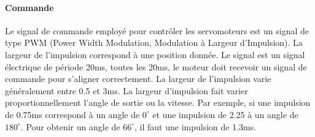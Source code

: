 				\paragraph{Commande}Le signal de commande employé pour contrôler les servomoteurs est un signal de type PWM (Power Width Modulation, Modulation à Largeur d'Impulsion). La largeur de l'impulsion correspond à une position donnée. Le signal est un signal électrique de période 20ms, toutes les 20ms, le moteur doit recevoir un signal de commande pour s'aligner correctement. La largeur de l'impulsion varie généralement entre 0.5 et 3ms. La largeur d'impulsion fait varier proportionnellement l'angle de sortie ou la vitesse. Par exemple, si une impulsion de 0.75ms correspond à un angle de $0^{\circ}$ et une impulsion de 2.25 à un angle de $180^{\circ}$. Pour obtenir un angle de $66^{\circ}$, il faut une impulsion de 1.3ms.  
			
